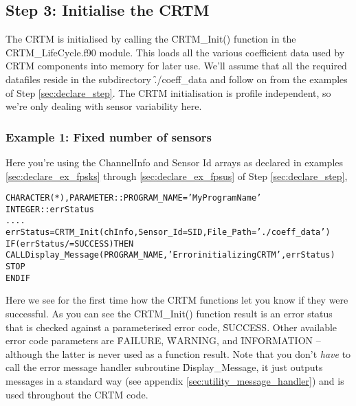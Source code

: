 \subsection{Step 3: Initialise the CRTM}
\label{sec:init_step}
The CRTM is initialised by calling the \f{CRTM\_Init()} function in the \f{CRTM\_LifeCycle.f90} module. This loads all the various coefficient data used by CRTM components into memory for later use. We'll assume that all the required datafiles reside in the subdirectory \f{./coeff\_data} and follow on from the examples of Step \ref{sec:declare_step}. The CRTM initialisation is profile independent, so we're only dealing with sensor variability here.

\subsubsection{Example 1: Fixed number of sensors}
\label{sec:init_ex_fns}
Here you're using the ChannelInfo and Sensor Id arrays as declared in examples \ref{sec:declare_ex_fpsks} through \ref{sec:declare_ex_fpsus} of Step \ref{sec:declare_step},
\begin{alltt}
  CHARACTER(*), PARAMETER :: PROGRAM_NAME='My Program Name'
  INTEGER :: errStatus
  ....
  errStatus = CRTM_Init( chInfo, Sensor_Id=SID, File_Path='./coeff_data' )
  IF ( errStatus /= SUCCESS ) THEN 
    CALL Display_Message( PROGRAM_NAME,'Error initializing CRTM',errStatus )
    STOP
  END IF\end{alltt}

Here we see for the first time how the CRTM functions let you know if they were successful. As you can see the \f{CRTM\_Init()} function result is an error status that is checked against a parameterised error code, \f{SUCCESS}. Other available error code parameters are \f{FAILURE}, \f{WARNING}, and \f{INFORMATION} -- although the latter is never used as a function result. Note that you don't \textit{have} to call the error message handler subroutine \f{Display\_Message}, it just outputs messages in a standard way (see appendix \ref{sec:utility_message_handler}) and is used throughout the CRTM code.


